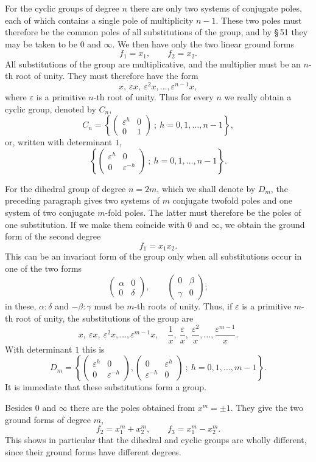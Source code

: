 \documentclass[11pt]{article}
\providecommand{\eps}{\varepsilon}
\providecommand{\eps}{\varepsilon}
\providecommand{\mat}[4]{\begin{pmatrix}#1&#2\\#3&#4\end{pmatrix}}
\providecommand{\mat}[4]{\begin{pmatrix}#1&#2\\#3&#4\end{pmatrix}}
\providecommand{\mat}[1]{\begin{pmatrix}#1\end{pmatrix}}
\begin{document}
For the cyclic groups of degree $n$ there are only two systems of conjugate poles, each of which contains a single pole of multiplicity $n-1$. These two poles must therefore be the common poles of all substitutions of the group, and by \S\,51 they may be taken to be $0$ and $\infty$. We then have only the two linear ground forms
\begin{equation}
 f_1=x_1,\qquad f_2=x_2 .
\tag{1}
\end{equation}
All substitutions of the group are multiplicative, and the multiplier must be an $n$-th root of unity. They must therefore have the form
\begin{equation}
 x,\ \eps x,\ \eps^2x,\ldots,\eps^{n-1}x,
\tag{2}
\end{equation}
where $\eps$ is a primitive $n$-th root of unity. Thus for every $n$ we really obtain a cyclic group, denoted by $C_n$,
\begin{equation}
 C_n=\left\{\mat{\eps^h}{0}{0}{1}\ ;\ h=0,1,\ldots,n-1\right\},
\tag{3}
\end{equation}
or, written with determinant $1$,
\[
 \left\{\mat{\eps^h}{0}{0}{\eps^{-h}}\ ;\ h=0,1,\ldots,n-1\right\}.
\]

For the dihedral group of degree $n=2m$, which we shall denote by $D_m$, the preceding paragraph gives two systems of $m$ conjugate twofold poles and one system of two conjugate $m$-fold poles. The latter must therefore be the poles of one substitution. If we make them coincide with $0$ and $\infty$, we obtain the ground form of the second degree
\begin{equation}
 f_1=x_1x_2 .
\tag{4}
\end{equation}
This can be an invariant form of the group only when all substitutions occur in one of the two forms
\[
 \mat{\alpha}{0}{0}{\delta},\qquad
 \mat{0}{\beta}{\gamma}{0};
\]
in these, $\alpha:\delta$ and $-\beta:\gamma$ must be $m$-th roots of unity. Thus, if $\eps$ is a primitive $m$-th root of unity, the substitutions of the group are
\[
x,\ \eps x,\ \eps^2x,\ldots,\eps^{m-1}x,\quad
\frac1x,\ \frac{\eps}{x},\ \frac{\eps^2}{x},\ldots,\frac{\eps^{m-1}}x .
\]
With determinant $1$ this is
\begin{equation}
D_m=\left\{
 \mat{\eps^h}{0}{0}{\eps^{-h}},
 \mat{0}{\eps^h}{\eps^{-h}}{0}
 \ ;\ h=0,1,\ldots,m-1
\right\}.
\tag{5}
\end{equation}
It is immediate that these substitutions form a group.

Besides $0$ and $\infty$ there are the poles obtained from $x^m=\pm1$. They give the two ground forms of degree $m$,
\begin{equation}
 f_2=x_1^m+x_2^m,\qquad
 f_3=x_1^m-x_2^m .
\tag{6}
\end{equation}
This shows in particular that the dihedral and cyclic groups are wholly different, since their ground forms have different degrees.
\end{document}
